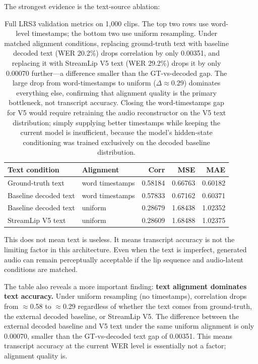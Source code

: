 \documentclass{article}
\begin{document}
The strongest evidence is the text-source ablation:
\begin{table}[h]
\centering
\small
\begin{tabular}{@{}llrrr@{}}
\toprule
\textbf{Text condition} & \textbf{Alignment} & \textbf{Corr} & \textbf{MSE} & \textbf{MAE} \\
\midrule
Ground-truth text         & word timestamps & 0.58184 & 0.66763 & 0.60182 \\
Baseline decoded text     & word timestamps & 0.57833 & 0.67162 & 0.60371 \\
\midrule
Baseline decoded text     & uniform         & 0.28679 & 1.68438 & 1.02352 \\
StreamLip V5 text         & uniform         & 0.28609 & 1.68488 & 1.02375 \\
\bottomrule
\end{tabular}
\caption{Full LRS3 validation metrics on 1,000 clips.
The top two rows use word-level timestamps; the bottom two use uniform resampling.
Under matched alignment conditions, replacing ground-truth text with baseline
decoded text (WER 20.2\%) drops correlation by only 0.00351, and replacing it
with StreamLip V5 text (WER 29.2\%) drops it by only 0.00070 further---a
difference smaller than the GT-vs-decoded gap.
The large drop from word-timestamps to uniform ($\Delta \approx 0.29$)
dominates everything else, confirming that alignment quality is the
primary bottleneck, not transcript accuracy.
Closing the word-timestamps gap for V5 would require retraining the audio
reconstructor on the V5 text distribution; simply supplying better
timestamps while keeping the current model is insufficient, because the
model's hidden-state conditioning was trained exclusively on the decoded
baseline distribution.}
\label{tab:text_ablation}
\end{table}

This does not mean text is useless. It means transcript accuracy is not the
limiting factor in this architecture. Even when the text is imperfect, generated
audio can remain perceptually acceptable if the lip sequence and audio-latent
conditions are matched.

The table also reveals a more important finding: \textbf{text alignment
dominates text accuracy.} Under uniform resampling (no timestamps),
correlation drops from $\approx$0.58 to $\approx$0.29 regardless of
whether the text comes from ground-truth, the external decoded baseline, or
StreamLip V5. The difference between the external decoded baseline and V5 text
under the same uniform alignment is only 0.00070, smaller than the GT-vs-decoded
text gap of 0.00351. This means transcript accuracy at the current WER level
is essentially not a factor; alignment quality is.
\end{document}
